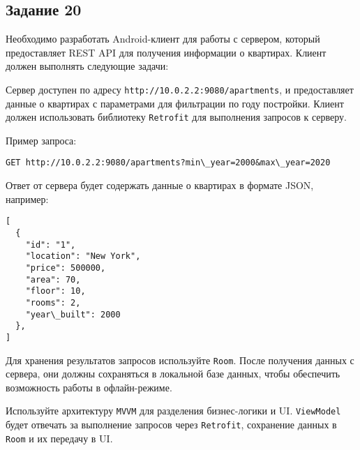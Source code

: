 \documentclass[a4paper,12pt]{article}
\begin{document}
\subsection*{Задание 20}

Необходимо разработать Android-клиент для работы с сервером, который предоставляет REST API для получения информации о квартирах. Клиент должен выполнять следующие задачи:

Сервер доступен по адресу \texttt{http://10.0.2.2:9080/apartments}, и предоставляет данные о квартирах с параметрами для фильтрации по году постройки. Клиент должен использовать библиотеку \texttt{Retrofit} для выполнения запросов к серверу.

Пример запроса:
\begin{verbatim}
GET http://10.0.2.2:9080/apartments?min\_year=2000&max\_year=2020
\end{verbatim}

Ответ от сервера будет содержать данные о квартирах в формате JSON, например:

\begin{verbatim}
[
  {
    "id": "1",
    "location": "New York",
    "price": 500000,
    "area": 70,
    "floor": 10,
    "rooms": 2,
    "year\_built": 2000
  },
]
\end{verbatim}

Для хранения результатов запросов используйте \texttt{Room}. 
После получения данных с сервера, они должны сохраняться в локальной базе данных, 
чтобы обеспечить возможность работы в офлайн-режиме. 

Используйте архитектуру \texttt{MVVM} для разделения бизнес-логики и UI. \texttt{ViewModel} будет отвечать за выполнение запросов через \texttt{Retrofit}, сохранение данных в \texttt{Room} и их передачу в UI.
\end{document}

